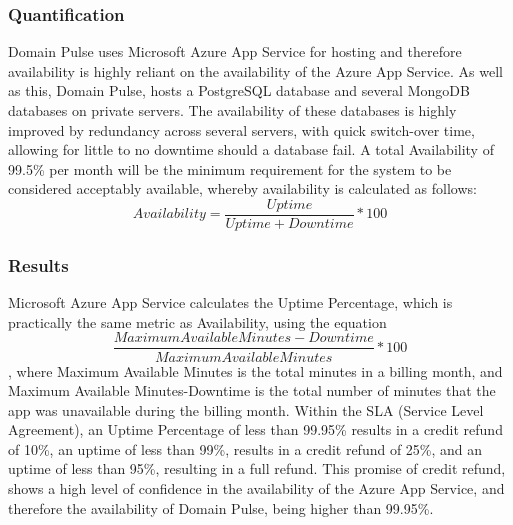 \documentclass[12pt]{article}
\begin{document}
\subsubsection{Quantification}
Domain Pulse uses Microsoft Azure App Service for hosting and therefore availability is highly reliant on the availability of the Azure App Service.
As well as this, Domain Pulse, hosts a PostgreSQL database and several MongoDB databases on private servers. The availability of these databases
is highly improved by redundancy across several servers, with quick switch-over time, allowing for little to no downtime should a database fail.
A total Availability of 99.5\% per month will be the minimum requirement for the system to be considered acceptably available, whereby
availability is calculated as follows:
\begin{equation}
    Availability = \frac{Uptime}{Uptime + Downtime} * 100
\end{equation}

\subsubsection{Results}
Microsoft Azure App Service calculates the Uptime Percentage, which is practically the same metric as Availability, using the equation
\begin{equation}
    \frac{Maximum Available Minutes-Downtime}{Maximum Available Minutes} * 100
\end{equation}
, where Maximum Available Minutes is the total minutes in a billing month, and Maximum Available Minutes-Downtime is the total number of minutes that the app was unavailable during the billing month.
Within the SLA (Service Level Agreement), an Uptime Percentage of less than 99.95\% results in a credit refund of 10\%, an uptime of less than 99\%, results in a credit refund of 25\%, and an uptime of less than 95\%, resulting in a full refund.
This promise of credit refund, shows a high level of confidence in the availability of the Azure App Service, and therefore the availability of Domain Pulse, being higher than 99.95\%.

\newpage
\end{document}
